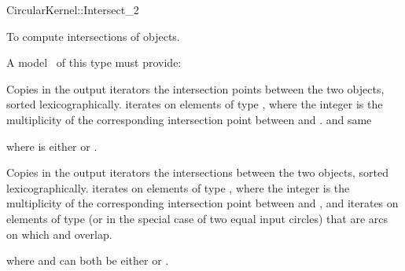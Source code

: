 \begin{ccRefFunctionObjectConcept}{CircularKernel::Intersect_2}

\ccDefinition

To compute intersections of objects.

\ccRefines



A model \ccVar\ of this type must provide:

{Copies in the output iterators the intersection points between the
two objects, sorted lexicographically.  iterates on
elements of type , where the integer is the multiplicity of the corresponding
intersection point between  and . }
and
{same}

where  is either  or
. 

{Copies in the output iterators the intersections between the two
objects, sorted lexicographically.  iterates on elements
of type ,
where the integer is the multiplicity of the corresponding
intersection point between  and , and 
iterates on elements of type  (or
 in the special case of two equal input circles)
that are arcs on which  and  overlap.} 

where  and  can both be either
 or
. 

\ccHasModels


\ccSeeAlso


\end{ccRefFunctionObjectConcept}

